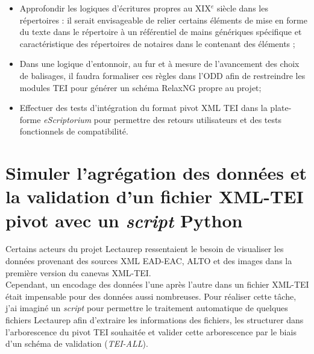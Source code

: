 \begin{itemize}
    Par exemple, une colonne correspond au type d'acte, la suivante au prix, la suivante au client etc.; dans un deuxième temps, il faudrait réunir les blocs horizontaux similaires si ces blocs concernent un même acte. Le dernier point constitue une tâche difficile dans la mesure où les répertoires de notaires présentent des écritures pouvant parfois déborder des colonnes ou prendre de la place sur plusieurs lignes. Toujours est-il que des outils existent comme \textit{Grobid}\footnote{Grobid documentation, URL: \url{https://grobid.readthedocs.io/en/latest/Introduction/}} (\textit{GeneRation Of BIbliographic Data}) pour extraire des informations sur la structure d'un document, parser et restructurer ces informations dans un fichier XML-TEI; un tel outil nécessiterai cependant des manipulations avant d'être exploitable sur les répertoires;\\
    \item Approfondir les logiques d'écritures propres au XIX$^e$ siècle dans les répertoires : il serait envisageable de relier certains éléments de mise en forme du texte dans le répertoire à un référentiel de mains génériques spécifique et caractéristique des répertoires de notaires dans le  contenant des éléments ;\\
    \item Dans une logique d'entonnoir, au fur et à mesure de l'avancement des choix de balisages, il faudra formaliser ces règles dans l'ODD afin de restreindre les modules TEI pour générer un schéma RelaxNG propre au projet;\\
    \item Effectuer des tests d'intégration du format pivot XML TEI dans la plate-forme \textit{eScriptorium} pour permettre des retours utilisateurs et des tests fonctionnels de compatibilité. 
\end{itemize}
\newpage
\section{Simuler l'agrégation des données et la validation d'un fichier XML-TEI pivot avec un \textit{script} Python}\label{generator-lecto-dev}

Certains acteurs du projet Lectaurep ressentaient le besoin de visualiser les données provenant des sources XML EAD-EAC, ALTO et des images dans la première version du canevas XML-TEI.\\

Cependant, un encodage  des données l'une après l'autre dans un fichier XML-TEI était impensable pour des données aussi nombreuses. Pour réaliser cette tâche, j'ai imaginé un \textit{script} pour permettre le traitement automatique de quelques fichiers Lectaurep afin d'extraire les informations des fichiers, les structurer dans l'arborescence du pivot TEI souhaitée et valider cette arborescence par le biais d'un schéma de validation (\textit{TEI-ALL}).\\

